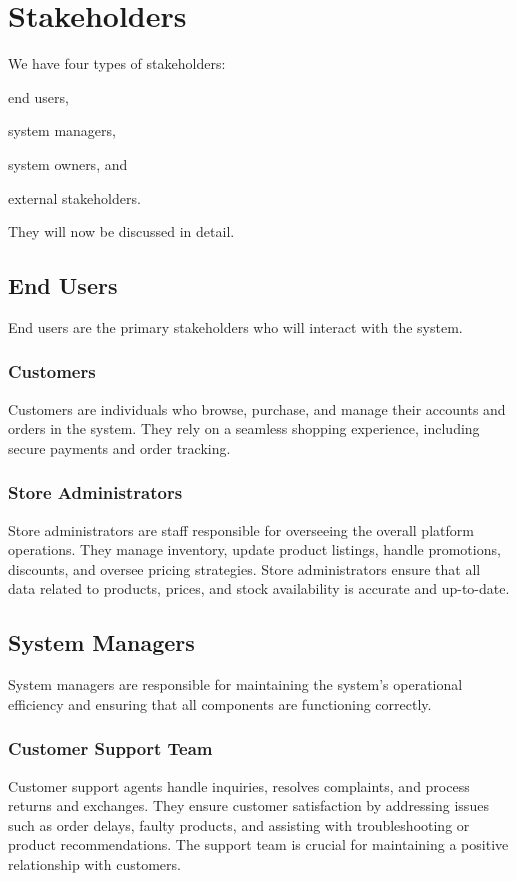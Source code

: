 \documentclass[twoside,a4paper,journal]{IEEEtran}
\begin{document}
\section{Stakeholders}
We have four types of stakeholders:
\begin{enumerate*}
  \item end users,
  \item system managers,
  \item system owners, and
  \item external stakeholders.
\end{enumerate*}
They will now be discussed in detail.

\subsection{End Users}
End users are the primary stakeholders who will interact with the system.

\subsubsection{Customers}
Customers are individuals who browse, purchase, and manage their accounts and
orders in the system. They rely on a seamless shopping experience, including
secure payments and order tracking.

\subsubsection{Store Administrators}
Store administrators are staff responsible for overseeing the overall platform
operations. They manage inventory, update product listings, handle promotions,
discounts, and oversee pricing strategies. Store administrators ensure that all
data related to products, prices, and stock availability is accurate and
up-to-date.

\subsection{System Managers}
System managers are responsible for maintaining the system's operational
efficiency and ensuring that all components are functioning correctly.

\subsubsection{Customer Support Team}
Customer support agents handle inquiries, resolves complaints, and process
returns and exchanges.
They ensure customer satisfaction by addressing issues such as order delays,
faulty products, and assisting with troubleshooting or product recommendations. 
The support team is crucial for maintaining a positive relationship with
customers.
\end{document}
